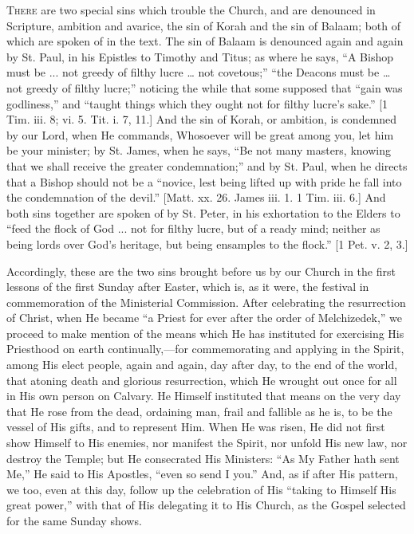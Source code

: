 T\textsc{here} are two special sins which trouble the Church, and are
denounced in Scripture, ambition and avarice, the sin of Korah and the
sin of Balaam; both of which are spoken of in the text. The sin of
Balaam is denounced again and again by St. Paul, in his Epistles to
Timothy and Titus; as where he says, ``A Bishop must be ... not
greedy of filthy lucre … not covetous;'' ``the Deacons must
be … not greedy of filthy lucre;'' noticing the while that some
supposed that ``gain was godliness,'' and ``taught things
which they ought not for filthy lucre's sake.'' [1 Tim. iii. 8;
vi. 5. Tit. i. 7, 11.] And the sin of Korah, or ambition, is condemned
by our Lord, when He commands, Whosoever will be great among you, let
him be your minister; by St. James, when he says, ``Be not many
masters, knowing that we shall receive the greater condemnation;''
and by St. Paul, when he directs that a Bishop should not be a
``novice, lest being lifted up with pride he fall into the
condemnation of the devil.'' [Matt. xx. 26. James iii. 1. 1 Tim.
iii. 6.] And both sins together are spoken of by St. Peter, in his
exhortation to the Elders to ``feed the flock of God ... not for
filthy lucre, but of a ready mind; neither as being lords over God's
heritage, but being ensamples to the flock.'' [1 Pet. v. 2, 3.]

Accordingly, these are the two sins brought before us by our Church
in the first lessons of the first Sunday after Easter, which is, as it
were, the festival in commemoration of the Ministerial Commission.
After celebrating the resurrection of Christ, when He became ``a
Priest for ever after the order of Melchizedek,'' we proceed to
make mention of the means which He has instituted for exercising His
Priesthood on earth continually,—for commemorating and applying in
the Spirit, among His elect people, again and again, day after day, to
the end of the world, that atoning death and glorious resurrection,
which He wrought out once for all in His own person on Calvary. He
Himself instituted that means on the very day that He rose from the
dead, ordaining man, frail and fallible as he is, to be the vessel of
His gifts, and to represent Him. When He was risen, He did not first
show Himself to His enemies, nor manifest the Spirit, nor unfold His
new law, nor destroy the Temple; but He consecrated His Ministers:
``As My Father hath sent Me,'' He said to His Apostles,
``even so send I you.'' And, as if after His pattern, we too,
even at this day, follow up the celebration of His ``taking to
Himself His great power,'' with that of His delegating it to His
Church, as the Gospel selected for the same Sunday shows.


